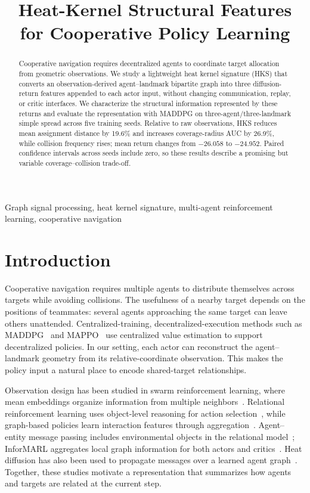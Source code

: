 \documentclass{article}
\title{Heat-Kernel Structural Features for Cooperative Policy Learning}
\begin{document}
\maketitle
\begin{abstract}
Cooperative navigation requires decentralized agents to coordinate target allocation from geometric observations. We study a lightweight heat kernel signature (HKS) that converts an observation-derived agent--landmark bipartite graph into three diffusion-return features appended to each actor input, without changing communication, replay, or critic interfaces. We characterize the structural information represented by these returns and evaluate the representation with MADDPG on three-agent/three-landmark simple spread across five training seeds. Relative to raw observations, HKS reduces mean assignment distance by 19.6\% and increases coverage-radius AUC by 26.9\%, while collision frequency rises; mean return changes from $-26.058$ to $-24.952$. Paired confidence intervals across seeds include zero, so these results describe a promising but variable coverage--collision trade-off.
\end{abstract}
\begin{keywords}
Graph signal processing, heat kernel signature, multi-agent reinforcement learning, cooperative navigation
\end{keywords}

\section{Introduction}
Cooperative navigation requires multiple agents to distribute themselves across targets while avoiding collisions. The usefulness of a nearby target depends on the positions of teammates: several agents approaching the same target can leave others unattended. Centralized-training, decentralized-execution methods such as MADDPG~\cite{lowe} and MAPPO~\cite{mappo} use centralized value estimation to support decentralized policies. In our setting, each actor can reconstruct the agent--landmark geometry from its relative-coordinate observation. This makes the policy input a natural place to encode shared-target relationships.

Observation design has been studied in swarm reinforcement learning, where mean embeddings organize information from multiple neighbors~\cite{swarm}. Relational reinforcement learning uses object-level reasoning for action selection~\cite{zambaldi}, while graph-based policies learn interaction features through aggregation~\cite{graphpg,gcrl}. Agent--entity message passing includes environmental objects in the relational model~\cite{emp}; InforMARL aggregates local graph information for both actors and critics~\cite{informarl}. Heat diffusion has also been used to propagate messages over a learned agent graph~\cite{cdc}. Together, these studies motivate a representation that summarizes how agents and targets are related at the current step.
\end{document}
